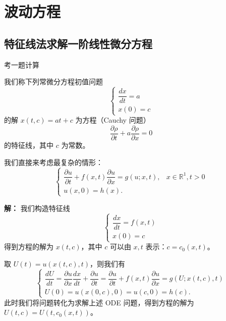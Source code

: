 \documentclass[12pt,a4paper]{ctexart}
\begin{document}
	\section{波动方程}
	
	\subsection{特征线法求解一阶线性微分方程}
	
	考一题计算
	
	我们称下列常微分方程初值问题
	\begin{equation}
		\begin{cases}
			\dfrac{dx}{dt} = a \\[6pt]
			x(0) = c
		\end{cases}
	\end{equation}
	的解 $x(t,c) = at + c$ 为方程（Cauchy 问题）
	\begin{equation}
		\frac{\partial \rho}{\partial t} + a \frac{\partial \rho}{\partial x} = 0
	\end{equation}
	的特征线，其中 $c$ 为常数。
	
	我们直接来考虑最复杂的情形：
	\begin{equation}
		\begin{cases}
			\dfrac{\partial u}{\partial t} + f(x,t)\dfrac{\partial u}{\partial x} = g(u; x, t), & x \in \mathbb{R}^1, t > 0 \\[8pt]
			u(x,0) = h(x).
		\end{cases}
	\end{equation}
	
	\textbf{解：} 我们构造特征线
	\begin{equation}
		\begin{cases}
			\dfrac{dx}{dt} = f(x,t) \\[6pt]
			x(0) = c
		\end{cases}
	\end{equation}
	得到方程的解为 $x(t,c)$，其中 $c$ 可以由 $x,t$ 表示：$c = c_0(x,t)$。
	
	取 $U(t) = u(x(t,c), t)$，则我们有
	\begin{equation}
		\begin{cases}
			\dfrac{dU}{dt} = \dfrac{\partial u}{\partial x} \dfrac{dx}{dt} + \dfrac{\partial u}{\partial t} = \dfrac{\partial u}{\partial t} + f(x,t)\dfrac{\partial u}{\partial x} = g(U; x(t,c), t) \\[10pt]
			U(0) = u(x(0,c), 0) = u(c,0) = h(c).
		\end{cases}
	\end{equation}
	此时我们将问题转化为求解上述 ODE 问题，得到方程的解为 $U(t,c) = U(t, c_0(x,t))$。
	
\end{document}
